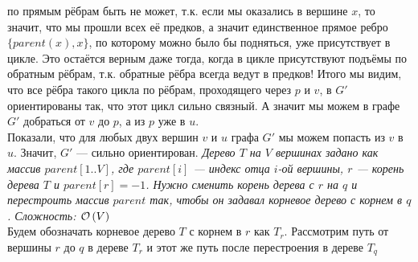 по прямым рёбрам быть не может, т.к. если мы оказались в вершине $x$, то значит, что мы прошли всех её предков, а значит единственное
прямое ребро $\lbrace parent(x),x \rbrace$, по которому можно было бы подняться, уже присутствует в цикле. Это остаётся верным даже тогда,
когда в цикле присутствуют подъёмы по обратным рёбрам, т.к. обратные рёбра всегда ведут в предков! Итого мы видим, что все рёбра
такого цикла по рёбрам, проходящего через $p$ и $v$, в $G'$ ориентированы так, что этот цикл сильно связный. А значит мы можем
в графе $G'$ добраться от $v$ до $p$, а из $p$ уже в $u$.\\
Показали, что для любых двух вершин $v$ и $u$ графа $G'$ мы можем попасть из $v$ в $u$. Значит, $G'$ --- сильно ориентирован. \xqed
{}
\textit{Дерево $T$ на $V$ вершинах задано как массив $parent[1..V]$, где $parent[i]$ --- индекс отца $i$-ой вершины, $r$ --- корень дерева $T$ и $parent[r]=-1$. Нужно сменить корень дерева с $r$ на $q$ и перестроить массив $parent$ так, чтобы он задавал корневое дерево с корнем в $q$. Сложность: $\mathcal{O}\left(V\right)$}\\
Будем обозначать корневое дерево $T$ с корнем в $r$ как $T_r$.
Рассмотрим путь от вершины $r$ до $q$ в дереве $T_r$ и этот же путь после перестроения в дереве $T_q$
